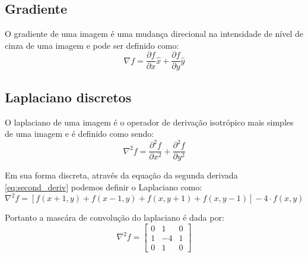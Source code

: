\documentclass[10pt,a4paper]{article}
\begin{document}
\subsection{Gradiente}
O gradiente de uma imagem é uma mudança direcional na intensidade de nível de cinza de uma imagem e pode ser definido como:
\begin{equation}
  \nabla f = \frac{\partial f}{\partial x} \hat{x} + \frac{\partial f}{\partial y} \hat{y}
  \label{eq:gradient}
\end{equation}

\subsection{Laplaciano discretos}
O laplaciano de uma imagem é o operador de derivação isotrópico mais simples de uma imagem e é definido como sendo:
\begin{equation}
  \nabla^{2} f = \frac{\partial^2 f}{\partial x^2} + \frac{\partial^2 f}{\partial y^2}
  \label{eq:laplaciano}
\end{equation}

Em sua forma discreta, através da equação da segunda derivada \ref{eq:second_deriv} podemos definir o Laplaciano como:
\begin{equation}
  \nabla^{2} f = [f(x + 1, y) + f(x - 1, y) + f(x, y + 1) + f(x, y - 1)] - 4 \cdot f(x,y)
  \label{eq:discrete_laplaciano}
\end{equation}

Portanto a mascára de convolução do laplaciano é dada por:
\begin{equation}
  \nabla^{2} f =\left[\begin{array}{ccc}
    0 &  1 & 0\\
    1 & -4 & 1\\
    0 &  1 & 0
  \end{array}\right]
  \label{mask:discrete_laplaciano}
\end{equation}
\newpage
\end{document}
